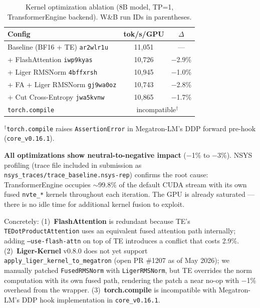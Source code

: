 \documentclass[10pt,twocolumn,letterpaper]{article}
\begin{document}
\begin{table}[h]
  \caption{Kernel optimization ablation (8B model, TP=1, TransformerEngine backend). W\&B run IDs in parentheses.}
  \label{tab:kernels}
  \centering
  \small
  \begin{tabular}{@{}lcc@{}}
    \toprule
    Config & tok/s/GPU & $\Delta$ \\
    \midrule
    Baseline (BF16 + TE) {\tiny\texttt{ar2wlr1u}}     & 11{,}051 & ---       \\
    + FlashAttention {\tiny\texttt{iwp9kyas}}          & 10{,}726 & $-$2.9\%  \\
    + Liger RMSNorm {\tiny\texttt{4bffxrsh}}           & 10{,}945 & $-$1.0\%  \\
    + FA + Liger RMSNorm {\tiny\texttt{gj9wa0oz}}      & 10{,}743 & $-$2.8\%  \\
    + Cut Cross-Entropy {\tiny\texttt{jwa5kvnw}}       & 10{,}865 & $-$1.7\%  \\
    \texttt{torch.compile}       & \multicolumn{2}{c}{incompatible$^\dagger$} \\
    \bottomrule
  \end{tabular}
  \vspace{2pt}
  {\footnotesize $^\dagger$\texttt{torch.compile} raises \texttt{AssertionError} in Megatron-LM's DDP forward pre-hook (\texttt{core\_v0.16.1}).}
\end{table}

\textbf{All optimizations show neutral-to-negative impact} ($-$1\% to $-$3\%). NSYS profiling (trace file included in submission as \texttt{nsys\_traces/trace\_baseline.nsys-rep}) confirms the root cause: TransformerEngine occupies $\sim$99.8\% of the default CUDA stream with its own fused \texttt{nvte\_*} kernels throughout each iteration. The GPU is already saturated — there is no idle time for additional kernel fusion to exploit.

Concretely: (1)~\textbf{FlashAttention} is redundant because TE's \texttt{TEDotProductAttention} uses an equivalent fused attention path internally; adding \texttt{--use-flash-attn} on top of TE introduces a conflict that costs 2.9\%. (2)~\textbf{Liger-Kernel} v0.8.0 does not yet support \texttt{apply\_liger\_kernel\_to\_megatron} (open PR \#1207 as of May 2026); we manually patched \texttt{FusedRMSNorm} with \texttt{LigerRMSNorm}, but TE overrides the norm computation with its own fused path, rendering the patch a near no-op with $-$1\% overhead from the wrapper. (3)~\textbf{torch.compile} is incompatible with Megatron-LM's DDP hook implementation in \texttt{core\_v0.16.1}.
\end{document}
